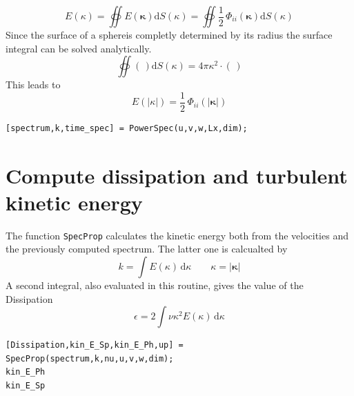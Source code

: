 \documentclass[preprint,12pt,ntfdMod]{elsarticle}
\begin{document}
\begin{par}

  \begin{equation}
      E(\kappa) = \oiint E(\boldsymbol\kappa)\mathrm{d}S(\kappa)
                = \oiint \frac{1}{2}\,\Phi_{ii}(\boldsymbol\kappa)\mathrm{d}S(\kappa)
  \end{equation}
  Since the surface of a sphereis completly determined by its radius the
  surface integral can be solved analytically.
  \begin{equation}
      \oiint(\,)\mathrm{d}S(\kappa) = 4\pi\kappa^2\cdot(\,)
  \end{equation}
This leads to
  \begin{equation}
      E(|\kappa|) = \frac{1}{2}\,\Phi_{ii}(|\boldsymbol\kappa|)
  \end{equation}

\end{par} \vspace{1em}
\begin{lstlisting}
[spectrum,k,time_spec] = PowerSpec(u,v,w,Lx,dim);
\end{lstlisting}
\begin{par}



\end{par} \vspace{1em}


\section{Compute dissipation and turbulent kinetic energy}

\begin{par}

  The function \lstinline!SpecProp! calculates the kinetic energy both
  from the velocities and the previously computed spectrum. The latter
  one is calcualted by
  \begin{equation}
      k = \int E(\kappa)\,\mathrm{d}\kappa\qquad \kappa=|\boldsymbol\kappa|
  \end{equation}
  A second integral, also evaluated in this routine, gives the value
  of the Dissipation
  \begin{equation}
      \epsilon = 2\int\nu\kappa^2 E(\kappa)\,\mathrm{d}\kappa
  \end{equation}

\end{par} \vspace{1em}
\begin{lstlisting}
[Dissipation,kin_E_Sp,kin_E_Ph,up] = SpecProp(spectrum,k,nu,u,v,w,dim);
kin_E_Ph
kin_E_Sp
\end{lstlisting}
\begin{par}



\end{par} \vspace{1em}
\end{document}
